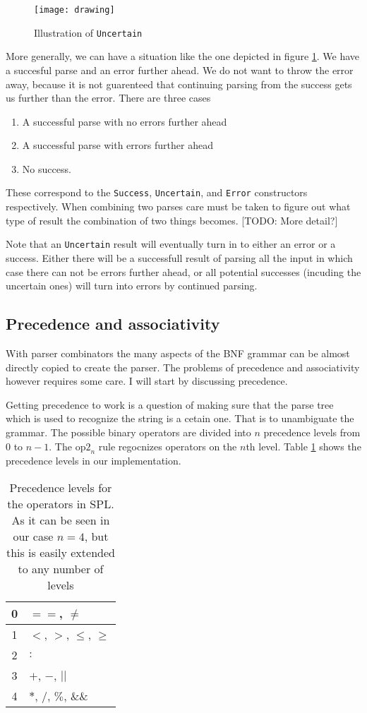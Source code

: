 \documentclass{scrartcl}
\begin{document}
\begin{figure}
\centering
\texttt{[image: drawing]}
\caption{Illustration of \lstinline{Uncertain}}
\label{fig:uncertain}
\end{figure}

More generally, we can have a situation like the one depicted in 
figure \ref{fig:uncertain}. We have a succesful parse and an error
further ahead. We do not want to throw the error away, because it is
not guarenteed that continuing parsing from the success gets us further
than the error. There are three cases
\begin{enumerate}
\item A successful parse with no errors further ahead
\item A successful parse with errors further ahead
\item No success.
\end{enumerate}
These correspond to the \lstinline{Success}, \lstinline{Uncertain}, and 
\lstinline{Error} constructors respectively. When combining two parses
care must be taken to figure out what type of result the combination
of two things becomes.
[TODO: More detail?]

Note that an
\lstinline{Uncertain} result will eventually turn in to either an
error or a success. Either there will be a successfull result of
parsing all the input in which case there can not be errors further
ahead, or all potential successes (incuding the uncertain ones) will
turn into errors by continued parsing.

\subsection{Precedence and associativity}

With parser combinators the many aspects of the BNF grammar can be
almost directly copied to create the parser. The problems of 
precedence and associativity however requires some care. I will start
by discussing precedence.

Getting precedence to work is a question of making
sure that the parse tree which is used to recognize the string is
a cetain one. That is to unambiguate the grammar. The possible
binary operators are divided into $n$ precedence levels 
from $0$ to $n-1$. The
$\text{op2}_n$ rule regocnizes operators on the $n$th level. Table
\ref{tab:precedence} shows the precedence levels in our implementation.

\begin{table}
\centering
\begin{tabular}{| c | l | }
\hline
0 & $==$, $\neq$ \\
\hline
1 & $<$, $>$, $\leq$, $\geq$ \\
\hline
2 & $:$ \\
\hline
3 & $+$, $-$, $||$ \\
\hline
4 & $*$, $/$, $\%$, $\&\&$ \\
\hline
\end{tabular}
\caption{Precedence levels for the operators in SPL. As it can be seen
 in our case $n=4$, but this is easily extended to any number of
levels}
\label{tab:precedence}
\end{table}
\end{document}
